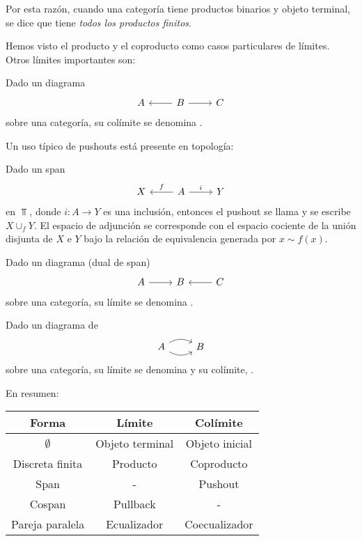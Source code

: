 Por esta razón, cuando una categoría tiene productos binarios y objeto terminal, se dice que tiene \emph{todos los productos finitos}.

Hemos visto el producto y el coproducto como casos particulares de límites.
Otros límites importantes son:
\begin{definition}
Dado un diagrama 
\[ \begin{tikzcd}
A & B \arrow[l] \arrow[r] & C
\end{tikzcd} \]
sobre una categoría, su colímite se denomina .
\end{definition}

Un uso típico de pushouts está presente en topología:
\begin{example} %
Dado un span
\[ \begin{tikzcd}
X & A \arrow[l,"f" above] \arrow[r,"i"] & Y
\end{tikzcd} \]
en $\Top$, donde $i \colon A \to Y$ es una inclusión, entonces el pushout se llama  y se escribe $X \cup_f Y$.
El espacio de adjunción se corresponde con el espacio cociente de la unión disjunta de $X$ e $Y$ bajo la relación de equivalencia generada por $x \sim f(x)$. 
\end{example}

\begin{definition}
Dado un diagrama  (dual de span)
\[ \begin{tikzcd}
A \arrow[r] & B & C \arrow[l]
\end{tikzcd} \]
sobre una categoría, su límite se denomina .
\end{definition}
\begin{definition}
Dado un diagrama de 
\[ \begin{tikzcd}
A \arrow[r,bend left] \arrow[r,bend right] & B
\end{tikzcd} \]
sobre una categoría, su límite se denomina  y su colímite, .
\end{definition}

En resumen:

\begin{center}
\begin{tabular}{ c | c | c }
  Forma & Límite & Colímite\\
  \hline
  $\emptyset$ & Objeto terminal & Objeto inicial \\
  Discreta finita & Producto & Coproducto \\
  Span & - & Pushout \\
  Cospan & Pullback & - \\
  Pareja paralela & Ecualizador & Coecualizador
\end{tabular}
\end{center}

